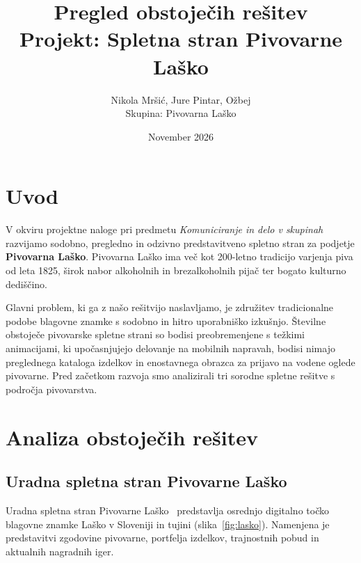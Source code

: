 \documentclass[11pt,a4paper]{article}
\title{\textbf{Pregled obstoječih rešitev} \\ \large Projekt: Spletna stran Pivovarne Laško}
\author{Nikola Mršić, Jure Pintar, Ožbej \\ \small Skupina: Pivovarna Laško}
\date{November 2026}
\begin{document}
\maketitle
\tableofcontents
\newpage

\section{Uvod}
\label{sec:uvod}

V okviru projektne naloge pri predmetu \emph{Komuniciranje in delo v skupinah} razvijamo sodobno, pregledno in odzivno predstavitveno spletno stran za podjetje \textbf{Pivovarna Laško}. Pivovarna Laško ima več kot 200-letno tradicijo varjenja piva od leta 1825, širok nabor alkoholnih in brezalkoholnih pijač ter bogato kulturno dediščino.

Glavni problem, ki ga z našo rešitvijo naslavljamo, je združitev tradicionalne podobe blagovne znamke s sodobno in hitro uporabniško izkušnjo. Številne obstoječe pivovarske spletne strani so bodisi preobremenjene s težkimi animacijami, ki upočasnjujejo delovanje na mobilnih napravah, bodisi nimajo preglednega kataloga izdelkov in enostavnega obrazca za prijavo na vodene oglede pivovarne. Pred začetkom razvoja smo analizirali tri sorodne spletne rešitve s področja pivovarstva.

\section{Analiza obstoječih rešitev}
\label{sec:analiza}

\subsection{Uradna spletna stran Pivovarne Laško}

Uradna spletna stran Pivovarne Laško~\cite{lasko} predstavlja osrednjo digitalno točko blagovne znamke Laško v Sloveniji in tujini (slika~\ref{fig:lasko}). Namenjena je predstavitvi zgodovine pivovarne, portfelja izdelkov, trajnostnih pobud in aktualnih nagradnih iger.
\end{document}
